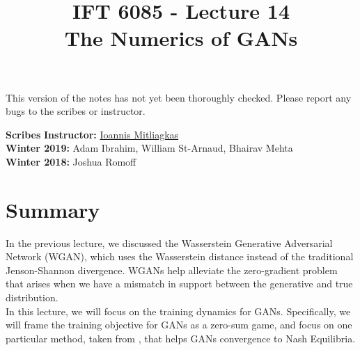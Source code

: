 \documentclass{article}
\title{IFT 6085 - Lecture 14 \\ 
The Numerics of GANs }
\date{}
\begin{document}
 

\maketitle

\vspace{-0.5in}
\begin{center}
This version of the notes has not yet been thoroughly checked.
Please report any bugs to the scribes or instructor.
\end{center}
\vspace{0.2in}

\textbf{Scribes}\hfill
\textbf{Instructor:}  {\href{https://mitliagkas.github.io/}{Ioannis Mitliagkas}}\\
\textbf{Winter 2019:} Adam Ibrahim, William St-Arnaud, Bhairav Mehta \\
\textbf{Winter 2018:} Joshua Romoff



\newcommand{\infgc}{\inf_{g \in \mathcal{C}}}
\newcommand{\supgc}{\sup_{g \in \mathcal{C}}}

\newcommand{\Prob}{\mathbb{P}}
\newcommand{\E}{\mathbb{E}}
\newcommand{\reals}{\mathbb{R}}

\section{Summary}

In the previous lecture, we discussed the Wasserstein Generative Adversarial Network (WGAN), which uses the Wasserstein distance instead of the traditional Jenson-Shannon divergence. WGANs help alleviate the zero-gradient problem that arises when we have a mismatch in support between the generative and true distribution.
\\

In this lecture, we will focus on the training dynamics for GANs. Specifically, we will frame the training objective for GANs as a zero-sum game, and focus on one particular method, taken from \cite{MeschederNG17a}, that helps GANs convergence to Nash Equilibria. 
\end{document}
